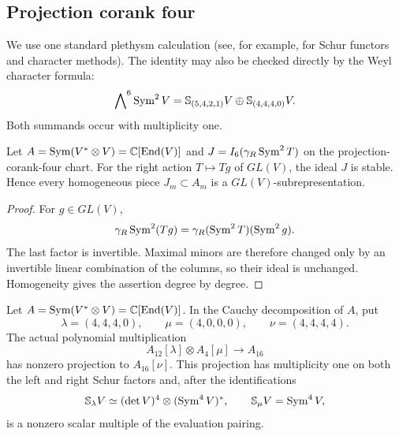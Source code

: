 \subsection{Projection corank four}

We use one standard plethysm calculation (see, for example,
\cite{FultonHarris} for Schur functors and character methods).  The
identity may also be checked directly by the Weyl character formula:
\begin{equation}\label{eq:plethysm-corank4}
 \bigwedge\nolimits^6\operatorname{Sym}^2V
 =
 \mathbb S_{(5,4,2,1)}V
 \oplus
 \mathbb S_{(4,4,4,0)}V.
\end{equation}
Both summands occur with multiplicity one.

\begin{lemma}
\label{lem:corank4-ideal-equivariance}
Let \(A=\operatorname{Sym}(V^*\otimes V)=\mathbb C[\operatorname{End}(V)]\) and
\(J=I_6(\gamma_R\operatorname{Sym}^2T)\) on the projection-corank-four chart.
For the right action \(T\mapsto Tg\) of \(GL(V)\), the ideal \(J\)
is stable.  Hence every homogeneous piece \(J_m\subset A_m\) is a
\(GL(V)\)-subrepresentation.
\end{lemma}

\begin{proof}
For \(g\in GL(V)\),
\[
 \gamma_R\operatorname{Sym}^2(Tg)
 =
 \gamma_R(\operatorname{Sym}^2T)(\operatorname{Sym}^2g).
\]
The last factor is invertible.  Maximal minors are therefore changed
only by an invertible linear combination of the columns, so their
ideal is unchanged.  Homogeneity gives the assertion degree by degree.
\end{proof}
\begin{lemma}
\label{lem:effective-pieri-matrix-ring}
Let \(A=\operatorname{Sym}(V^*\otimes V)=\mathbb C[\operatorname{End}(V)]\).  In the Cauchy
decomposition of \(A\), put
\[
 \lambda=(4,4,4,0),\qquad \mu=(4,0,0,0),\qquad
 \nu=(4,4,4,4).
\]
The actual polynomial multiplication
\[
 A_{12}[\lambda]\otimes A_4[\mu]\longrightarrow A_{16}
\]
has nonzero projection to \(A_{16}[\nu]\).  This projection has
multiplicity one on both the left and right Schur factors and, after
the identifications
\[
 \mathbb S_\lambda V\simeq
 (\det V)^4\otimes(\operatorname{Sym}^4V)^*,\qquad
 \mathbb S_\mu V=\operatorname{Sym}^4V,
\]
is a nonzero scalar multiple of the evaluation pairing.
\end{lemma}

